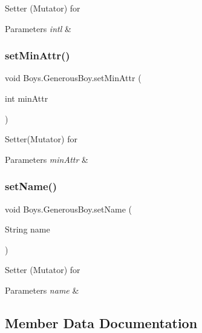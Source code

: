 Setter (Mutator) for 
\begin{DoxyParams}{Parameters}
{\em intl} & \\
\hline
\end{DoxyParams}
\mbox{\label{class_boys_1_1_generous_boy_a45958ef24ac3f12420dd0c9ff6dc1999}} 
\subsubsection{\texorpdfstring{set\+Min\+Attr()}{setMinAttr()}}
{\footnotesize\ttfamily void Boys.\+Generous\+Boy.\+set\+Min\+Attr (\begin{DoxyParamCaption}\item[{int}]{min\+Attr }\end{DoxyParamCaption})\hspace{0.3cm}{\ttfamily [inline]}}

Setter(\+Mutator) for 
\begin{DoxyParams}{Parameters}
{\em min\+Attr} & \\
\hline
\end{DoxyParams}
\mbox{\label{class_boys_1_1_generous_boy_a342605006bf8be1f553c53aeaf6f2537}} 
\subsubsection{\texorpdfstring{set\+Name()}{setName()}}
{\footnotesize\ttfamily void Boys.\+Generous\+Boy.\+set\+Name (\begin{DoxyParamCaption}\item[{String}]{name }\end{DoxyParamCaption})\hspace{0.3cm}{\ttfamily [inline]}}

Setter (Mutator) for 
\begin{DoxyParams}{Parameters}
{\em name} & \\
\hline
\end{DoxyParams}


\subsection{Member Data Documentation}
\mbox{\label{class_boys_1_1_generous_boy_ab3997644946f214b45321cfbf915cebf}} 
